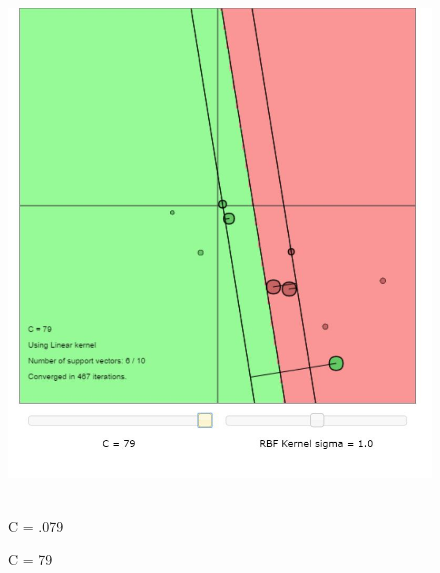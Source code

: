 \documentclass[11pt,oneside,a4paper]{article}
\begin{document}
\begin{figure}[H]
{	}%
	\else
	\hbox{%
		\includegraphics[height=\ht0]{../Figures/large_C_linear_kernal}%
	}%
	\fi
	\noindent
	\parbox{.45\textwidth}{%
		\centering
		\caption{C = .079}
		\label{fg:methods}
	}%
	\hfil
	\parbox{.45\textwidth}{%
		\centering
		\caption{C = 79}
		\label{fg:method_detail}
	}%
\end{figure}

 
\end{document}
